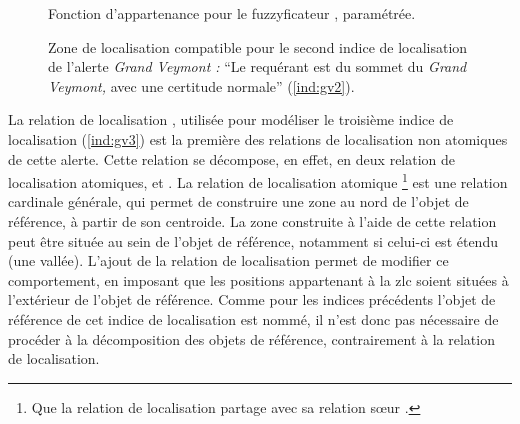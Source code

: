 \begin{figure}
  \centering
  
  \caption{Fonction d'appartenance pour le fuzzyficateur
    \protect{}, paramétrée.}
  \label{fig:fuzzy_veyont_sousSommet}
\end{figure}

\begin{figure}
  \centering
  
  \caption{Zone de localisation compatible pour le second indice de
    localisation de l'alerte \emph{Grand Veymont :} \enquote{Le
      requérant est \protect{} du sommet du
      \emph{Grand Veymont,} avec une certitude normale}
    (\ref{ind:gv2}).}
  \label{fig:ZLC_GrandVeymont_2}
\end{figure}


La relation de localisation ,
utilisée pour modéliser le troisième indice de localisation
(\ref{ind:gv3}) est la première des relations de localisation non
atomiques de cette alerte. Cette relation se décompose, en effet, en
deux relation de localisation atomiques,  et
. La relation de localisation
atomique  \footnote{Que la relation de
  localisation \protect{} partage avec
  sa relation sœur \protect{}.}
est une relation cardinale générale, qui permet de construire une zone
au nord de l'objet de référence, à partir de son centroide. La zone
construite à l'aide de cette relation peut être située au sein de
l'objet de référence, notamment si celui-ci est étendu (\eg une
vallée). L'ajout de la relation de localisation
 permet de modifier ce
comportement, en imposant que les positions appartenant à la \ac{zlc}
soient situées à l'extérieur de l'objet de référence. Comme pour les
indices précédents l'objet de référence de cet indice de localisation
est nommé, il n'est donc pas nécessaire de procéder à la décomposition
des objets de référence, contrairement à la relation de localisation.

